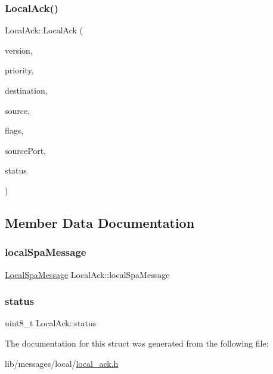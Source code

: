 \subsubsection{\texorpdfstring{Local\+Ack()}{LocalAck()}}
{\footnotesize\ttfamily Local\+Ack\+::\+Local\+Ack (\begin{DoxyParamCaption}\item[{uint8\+\_\+t}]{version,  }\item[{uint8\+\_\+t}]{priority,  }\item[{\hyperlink{structLogicalAddress}{Logical\+Address}}]{destination,  }\item[{\hyperlink{structLogicalAddress}{Logical\+Address}}]{source,  }\item[{uint16\+\_\+t}]{flags,  }\item[{uint16\+\_\+t}]{source\+Port,  }\item[{uint8\+\_\+t}]{status }\end{DoxyParamCaption})\hspace{0.3cm}{\ttfamily [inline]}}



\subsection{Member Data Documentation}
\mbox{\label{structLocalAck_aec0984fd1a1277eb62f8cb843993afb0}} 
\subsubsection{\texorpdfstring{local\+Spa\+Message}{localSpaMessage}}
{\footnotesize\ttfamily \hyperlink{structLocalSpaMessage}{Local\+Spa\+Message} Local\+Ack\+::local\+Spa\+Message}

\mbox{\label{structLocalAck_afab082585d3d05a6abd22f4498a8edca}} 
\subsubsection{\texorpdfstring{status}{status}}
{\footnotesize\ttfamily uint8\+\_\+t Local\+Ack\+::status}



The documentation for this struct was generated from the following file\+:\begin{DoxyCompactItemize}
\item 
lib/messages/local/\hyperlink{local__ack_8h}{local\+\_\+ack.\+h}\end{DoxyCompactItemize}
